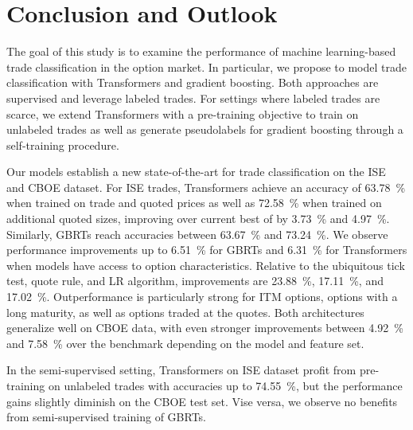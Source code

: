 \section{Conclusion and Outlook}\label{sec:conclusion-outlook}


The goal of this study is to examine the performance of machine learning-based trade classification in the option market. In particular, we propose to model trade classification with Transformers and gradient boosting. Both approaches are supervised and leverage labeled trades. For settings where labeled trades are scarce, we extend Transformers with a pre-training objective to train on unlabeled trades as well as generate pseudolabels for gradient boosting through a self-training procedure.

Our models establish a new state-of-the-art for trade classification on the \gls{ISE} and \gls{CBOE} dataset. For \gls{ISE} trades, Transformers achieve an accuracy of \SI{63.78}{\percent} when trained on trade and quoted prices as well as \SI{72.58}{\percent} when trained on additional quoted sizes, improving over current best of \textcite[][27]{grauerOptionTradeClassification2022} by \SI{3.73}{\percent} and \SI{4.97}{\percent}. Similarly, \glspl{GBRT} reach accuracies between \SI{63.67}{\percent} and \SI{73.24}{\percent}. We observe performance improvements up to \SI{6.51}{\percent} for \glspl{GBRT} and \SI{6.31}{\percent} for Transformers when models have access to option characteristics. Relative to the ubiquitous tick test, quote rule, and \gls{LR} algorithm, improvements are \SI{23.88}{\percent}, \SI{17.11}{\percent}, and \SI{17.02}{\percent}. Outperformance is particularly strong for \gls{ITM} options, options with a long maturity, as well as options traded at the quotes. Both architectures generalize well on \gls{CBOE} data, with even stronger improvements between \SI{4.92}{\percent} and \SI{7.58}{\percent} over the benchmark depending on the model and feature set. 

In the semi-supervised setting, Transformers on \gls{ISE} dataset profit from pre-training on unlabeled trades with accuracies up to \SI{74.55}{\percent}, but the performance gains slightly diminish on the \gls{CBOE} test set. Vise versa, we observe no benefits from semi-supervised training of \glspl{GBRT}.


